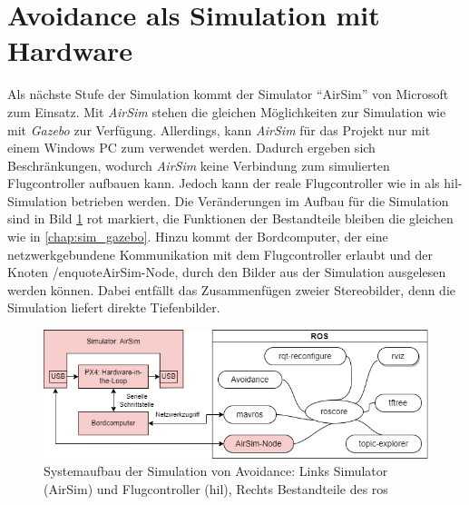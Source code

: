 \section{Avoidance als Simulation mit Hardware}
Als nächste Stufe der Simulation kommt der Simulator \enquote{AirSim} von Microsoft zum Einsatz. Mit \textit{AirSim} stehen die gleichen Möglichkeiten zur Simulation wie mit \textit{Gazebo} zur Verfügung. Allerdings, kann \textit{AirSim} für das Projekt nur mit einem Windows PC zum verwendet werden. Dadurch ergeben sich Beschränkungen, wodurch \textit{AirSim} keine Verbindung zum simulierten Flugcontroller aufbauen kann. Jedoch kann der reale Flugcontroller wie in \cite[Kapitel 5]{markusreinErweiterungBestehenderDrohnen2023} als \gls{hil}-Simulation betrieben werden. Die Veränderungen im Aufbau für die Simulation sind in Bild \ref{fig:system_sim_airsim} rot markiert, die Funktionen der Bestandteile bleiben die gleichen wie in \cref{chap:sim_gazebo}. Hinzu kommt der Bordcomputer, der eine netzwerkgebundene Kommunikation mit dem Flugcontroller erlaubt und der Knoten /enquote{AirSim-Node}, durch den Bilder aus der Simulation ausgelesen werden können. Dabei entfällt das Zusammenfügen zweier Stereobilder, denn die Simulation liefert direkte Tiefenbilder.

\begin{figure}[!h]
    \centering
    \includegraphics[width=\linewidth]{images/simulation_ros-Page-2.drawio.png}
    \caption[Systemaufbau der Simulation von Avoidance]{Systemaufbau der Simulation von Avoidance: Links Simulator (AirSim) und Flugcontroller (\gls{hil}), Rechts Bestandteile des \acrshort{ros}}
    \label{fig:system_sim_airsim}
\end{figure}

